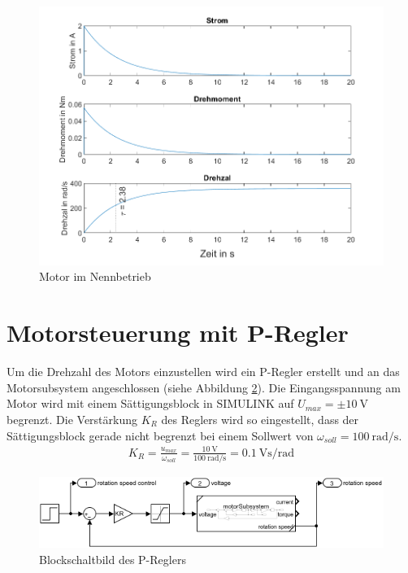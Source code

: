 \documentclass[
    paper=a4,
    fontsize=10pt,
    DIV=12,
    oneside,
]{scrartcl}
\begin{document}
    \begin{figure}[hbt]
        \centering
        \includegraphics[width=\imagewidth]{../versuch3/graphMotorModel.png}
        \caption{Motor im Nennbetrieb}
        \label{fig:graphMotor}
    \end{figure}   

\section{Motorsteuerung mit P-Regler}
    Um die Drehzahl des Motors einzustellen wird ein P-Regler erstellt und an das Motorsubsystem angeschlossen (siehe Abbildung \ref{fig:blockPController}). Die Eingangsspannung am Motor wird mit einem Sättigungsblock in SIMULINK auf \(U_{max} = \pm \SI{10}{\volt}\) begrenzt. Die Verstärkung \(K_R\) des Reglers wird so eingestellt, dass der Sättigungsblock gerade nicht begrenzt bei einem Sollwert von \(\omega_{soll} = \SI{100}{\radian\per\second}\).
    \begin{align}
        K_R = \frac{u_{max}}{\omega_{soll}} = \frac{\SI{10}{\volt}}{\SI{100}{\radian\per\second}} = \SI{0.1}{\volt\second\per\radian}
    \end{align}

    \begin{figure}[hbt]
        \centering
        \includegraphics[width=1.3\imagewidth]{../versuch3/blockPController}
        \caption{Blockschaltbild des P-Reglers}
        \label{fig:blockPController}
    \end{figure} 
\end{document}
